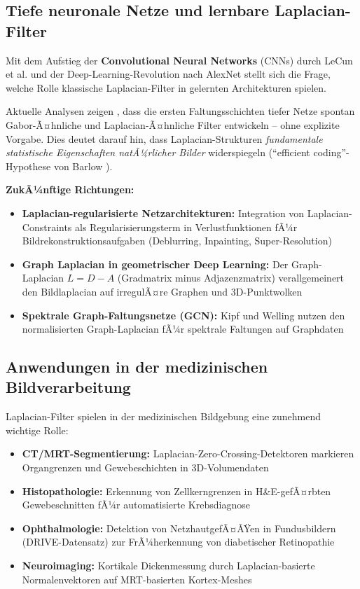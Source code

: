 ﻿\documentclass[a4paper,12pt]{article}
\theoremstyle{definition}
\begin{document}
\subsection{Tiefe neuronale Netze und lernbare Laplacian-Filter}

Mit dem Aufstieg der \textbf{Convolutional Neural Networks} (CNNs) durch LeCun et al. \cite{lecun1998}
und der Deep-Learning-Revolution nach AlexNet \cite{krizhevsky2012} stellt sich die Frage, welche
Rolle klassische Laplacian-Filter in gelernten Architekturen spielen.

Aktuelle Analysen zeigen \cite{zeiler2014}, dass die ersten Faltungsschichten tiefer Netze spontan
Gabor-Ã¤hnliche und Laplacian-Ã¤hnliche Filter entwickeln -- ohne explizite Vorgabe. Dies deutet
darauf hin, dass Laplacian-Strukturen \emph{fundamentale statistische Eigenschaften natÃ¼rlicher
Bilder} widerspiegeln (``efficient coding''-Hypothese von Barlow \cite{barlow1961}).

\textbf{ZukÃ¼nftige Richtungen:}
\begin{itemize}
    \item \textbf{Laplacian-regularisierte Netzarchitekturen:} Integration von Laplacian-Constraints
          als Regularisierungsterm in Verlustfunktionen fÃ¼r Bildrekonstruktionsaufgaben (Deblurring,
          Inpainting, Super-Resolution)
    \item \textbf{Graph Laplacian in geometrischer Deep Learning:} Der Graph-Laplacian $L = D - A$
          (Gradmatrix minus Adjazenzmatrix) verallgemeinert den Bildlaplacian auf irregulÃ¤re Graphen
          und 3D-Punktwolken \cite{bronstein2017}
    \item \textbf{Spektrale Graph-Faltungsnetze (GCN):} Kipf und Welling \cite{kipf2017} nutzen den
          normalisierten Graph-Laplacian fÃ¼r spektrale Faltungen auf Graphdaten
\end{itemize}

\subsection{Anwendungen in der medizinischen Bildverarbeitung}

Laplacian-Filter spielen in der medizinischen Bildgebung eine zunehmend wichtige Rolle:
\begin{itemize}
    \item \textbf{CT/MRT-Segmentierung:} Laplacian-Zero-Crossing-Detektoren markieren Organgrenzen
          und Gewebeschichten in 3D-Volumendaten
    \item \textbf{Histopathologie:} Erkennung von Zellkerngrenzen in H\&E-gefÃ¤rbten Gewebeschnitten
          fÃ¼r automatisierte Krebsdiagnose
    \item \textbf{Ophthalmologie:} Detektion von NetzhautgefÃ¤ÃŸen in Fundusbildern (DRIVE-Datensatz)
          zur FrÃ¼herkennung von diabetischer Retinopathie
    \item \textbf{Neuroimaging:} Kortikale Dickenmessung durch Laplacian-basierte Normalenvektoren
          auf MRT-basierten Kortex-Meshes \cite{jones2000}
\end{itemize}
\end{document}
